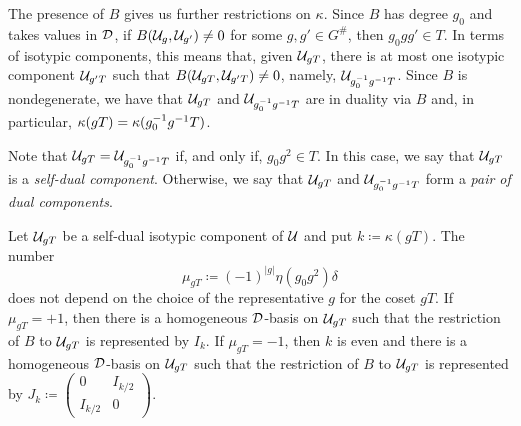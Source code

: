 
The presence of $B$ gives us further restrictions on $\kappa$. 
Since $B$ has degree $g_0$ and takes values in $\mathcal{D}$, if $B(\mathcal U_{g}, \mathcal U_{g'}) \neq 0$ for some $g, g' \in G^\#$, then $g_0 g g' \in T$. 
In terms of isotypic components, this means that, given $\mathcal U_{g T}$, there is at most one isotypic component $\mathcal U_{g'T}$ such that $B(\mathcal U_{gT}, \mathcal U_{g'T}) \neq 0$, namely, $\mathcal U_{g_0^{-1} g^{-1} T}$. 
Since $B$ is nondegenerate, we have that $\mathcal U_{g T}$ and $\mathcal U_{g_0^{-1} g^{-1} T}$ are in duality via $B$ and, in particular, $\kappa(g T) = \kappa(g_0^{-1} g ^{-1} T)$. 

Note that $\mathcal U_{g T} = \mathcal U_{g_0^{-1} g^{-1} T}$ if, and only if, $g_0 g^2 \in T$. 
In this case, we say that $\mathcal U_{gT}$ is a \emph{self-dual component}. 
Otherwise, we say that $\mathcal U_{gT}$ and $\mathcal U_{g_0^{-1} g^{-1} T}$ form a \emph{pair of dual components}.

\begin{lemma}\label{lemma:self-dual-components}
    Let $\mathcal U_{gT}$ be a self-dual isotypic component of $\mathcal U$ and put $k \coloneqq \kappa(gT)$. 
    The number 
    \begin{equation}
        \mu_{gT} \coloneqq (-1)^{|g|} \eta(g_0 g^2)\delta
    \end{equation}
    does not depend on the choice of the representative $g$ for the coset $gT$. 
    If $\mu_{gT} = +1$, then there is a homogeneous $\mathcal{D}$-basis on $\mathcal U_{gT}$ such that the restriction of $B$ to $\mathcal U_{gT}$ is represented by $I_k$. 
    If $\mu_{gT} = -1$, then $k$ is even and there is a homogeneous $\mathcal{D}$-basis on $\mathcal U_{gT}$ such that the restriction of $B$ to $\mathcal U_{gT}$ is represented by $J_k \coloneqq 
    \begin{pmatrix}
        0 & I_{k/2}\\
        I_{k/2} & 0
    \end{pmatrix}$. 
\end{lemma}

